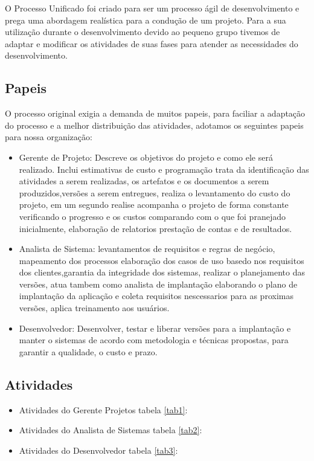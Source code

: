 \documentclass[	DIV=calc,%
							paper=a4,%
							fontsize=12pt,%
							onecolumn]{scrartcl}	 					%
\begin{document}
O Processo Unificado foi criado para ser um processo ágil de desenvolvimento e prega uma abordagem realística para a condução de um projeto. Para a sua utilização durante o desenvolvimento devido ao pequeno grupo tivemos de adaptar e modificar os atividades de suas fases para atender as necessidades do desenvolvimento.

\subsection{Papeis}

O processo original exigia a demanda de muitos papeis, para faciliar a adaptação do processo e a melhor distribuição das atividades, adotamos os seguintes papeis para nossa organização:

\begin{itemize}

	\item Gerente de Projeto: Descreve os objetivos do projeto e como ele será realizado. Inclui estimativas de custo e programação trata da identificação das atividades a serem realizadas, os artefatos e os documentos a serem produzidos,versões a serem entregues, realiza o levantamento do custo do projeto, em um segundo realise acompanha o projeto de forma constante verificando o progresso e os custos  comparando com o que foi pranejado inicialmente, elaboração de relatorios prestação de contas e de resultados.

	\item Analista de Sistema: levantamentos de requisitos e regras de negócio, mapeamento dos processos elaboração dos casos de uso basedo nos requisitos dos clientes,garantia da integridade dos sistemas, realizar o planejamento das versões, atua tambem como analista de implantação elaborando o plano de implantação da aplicação e coleta requisitos nescessarios para as proximas versões, aplica treinamento aos usuários.

	\item Desenvolvedor: Desenvolver, testar e liberar versões para a  implantação e manter o sistemas de acordo com metodologia e técnicas propostas, para garantir a qualidade, o custo e prazo.
\end{itemize} 
\subsection{Atividades}
\begin{itemize}
    

\item Atividades do Gerente Projetos tabela \ref{tab1}:


\item Atividades do Analista de Sistemas tabela \ref{tab2}:


\item Atividades do Desenvolvedor tabela \ref{tab3}:


\end{itemize}
\end{document}
